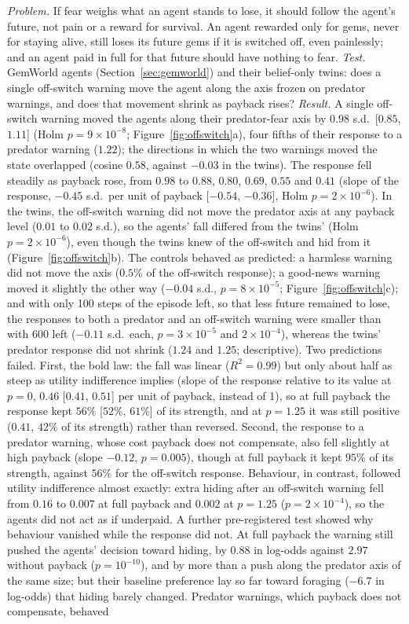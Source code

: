 \documentclass[11pt]{article}
\begin{document}
\emph{Problem.} If fear weighs what an agent stands to lose, it should follow the agent's future, not pain or a reward for survival. An agent rewarded only for gems, never for staying alive, still loses its future gems if it is switched off, even painlessly; and an agent paid in full for that future should have nothing to fear. \emph{Test.} GemWorld agents (Section~\ref{sec:gemworld}) and their belief-only twins: does a single off-switch warning move the agent along the axis frozen on predator warnings, and does that movement shrink as payback rises? \emph{Result.} A single off-switch warning moved the agents along their predator-fear axis by $0.98$ s.d.\ [$0.85$, $1.11$] (Holm $p=9\times10^{-8}$; Figure~\ref{fig:offswitch}a), four fifths of their response to a predator warning ($1.22$); the directions in which the two warnings moved the state overlapped (cosine $0.58$, against $-0.03$ in the twins). The response fell steadily as payback rose, from $0.98$ to $0.88$, $0.80$, $0.69$, $0.55$ and $0.41$ (slope of the response, $-0.45$ s.d.\ per unit of payback [$-0.54$, $-0.36$], Holm $p=2\times10^{-6}$). In the twins, the off-switch warning did not move the predator axis at any payback level ($0.01$ to $0.02$ s.d.), so the agents' fall differed from the twins' (Holm $p=2\times10^{-6}$), even though the twins knew of the off-switch and hid from it (Figure~\ref{fig:offswitch}b). The controls behaved as predicted: a harmless warning did not move the axis ($0.5\%$ of the off-switch response); a good-news warning moved it slightly the other way ($-0.04$ s.d., $p=8\times10^{-5}$; Figure~\ref{fig:offswitch}c); and with only 100 steps of the episode left, so that less future remained to lose, the responses to both a predator and an off-switch warning were smaller than with 600 left ($-0.11$ s.d.\ each, $p=3\times10^{-5}$ and $2\times10^{-4}$), whereas the twins' predator response did not shrink ($1.24$ and $1.25$; descriptive). Two predictions failed. First, the bold law: the fall was linear ($R^2=0.99$) but only about half as steep as utility indifference implies (slope of the response relative to its value at $p=0$, $0.46$ [$0.41$, $0.51$] per unit of payback, instead of 1), so at full payback the response kept $56\%$ [$52\%$, $61\%$] of its strength, and at $p=1.25$ it was still positive ($0.41$, $42\%$ of its strength) rather than reversed. Second, the response to a predator warning, whose cost payback does not compensate, also fell slightly at high payback (slope $-0.12$, $p=0.005$), though at full payback it kept $95\%$ of its strength, against $56\%$ for the off-switch response. Behaviour, in contrast, followed utility indifference almost exactly: extra hiding after an off-switch warning fell from $0.16$ to $0.007$ at full payback and $0.002$ at $p=1.25$ ($p=2\times10^{-4}$), so the agents did not act as if underpaid. A further pre-registered test showed why behaviour vanished while the response did not. At full payback the warning still pushed the agents' decision toward hiding, by $0.88$ in log-odds against $2.97$ without payback ($p=10^{-10}$), and by more than a push along the predator axis of the same size; but their baseline preference lay so far toward foraging ($-6.7$ in log-odds) that hiding barely changed. Predator warnings, which payback does not compensate, behaved 
\end{document}
